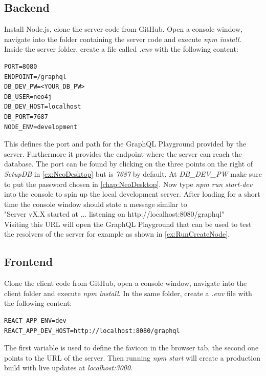 \subsection{Backend}
Install Node.js, clone the server \cite{GitServer} code from GitHub. Open a console window, navigate into the folder containing the server code and execute \emph{npm install}. Inside the server folder, create a file called \emph{.env} with the following content:
\lstset{language=Docker}
\begin{lstlisting}[caption={Environment Variables for the Server}]
PORT=8080
ENDPOINT=/graphql
DB_DEV_PW=<YOUR_DB_PW>
DB_USER=neo4j
DB_DEV_HOST=localhost
DB_PORT=7687
NODE_ENV=development
\end{lstlisting}
This defines the port and path for the GraphQL Playground provided by the server. Furthermore it provides the endpoint where the server can reach the database. The port can be found by clicking on the three points on the right of \emph{SetupDB} in \autoref{ex:NeoDesktop} but is \emph{7687} by default. At \emph{DB\_DEV\_PW} make sure to put the password chosen in \autoref{chap:NeoDesktop}.
Now type \emph{npm run start-dev} into the console to spin up the local development server. After loading for a short time the console window should state a message similar to \\
"Server vX.X started at ... listening on http://localhost:8080/graphql" \\
Visiting this URL will open the GraphQL Playground that can be used to test the resolvers of the server for example as shown in \autoref{ex:RunCreateNode}.

\subsection{Frontend}
Clone the client \cite{GitClient} code from GitHub, open a console window, navigate into the client folder and execute \emph{npm install}. In the same folder, create a \emph{.env} file with the following content:
\begin{lstlisting}[caption={Environment Variables for the Frontend}]
REACT_APP_ENV=dev
REACT_APP_DEV_HOST=http://localhost:8080/graphql
\end{lstlisting}
The first variable is used to define the favicon in the browser tab, the second one points to the URL of the server. Then running \emph{npm start} will create a production build with live updates at \emph{localhost:3000}.

